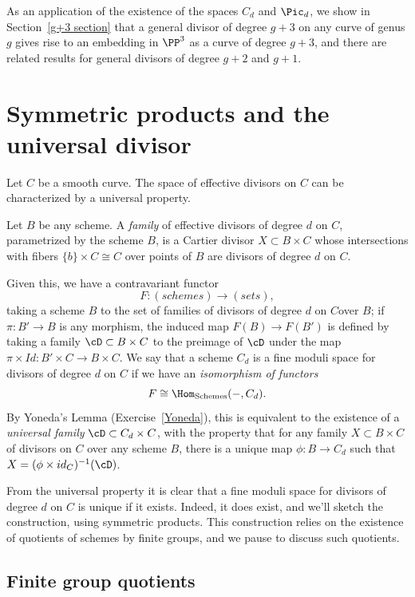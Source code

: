 As an application of the existence of the spaces $C_d$ and $\Pic_d$, we show in Section~\ref{g+3 section} that a general divisor of degree $g+3$ on any curve of genus $g$ gives rise to an embedding in $\PP^3$ as a curve of degree $g+3$, and there are related results for general divisors of degree $g+2$ and $g+1$. 

\section{Symmetric products and the universal divisor}\label{symmetric section}

Let $C$ be a smooth curve. The space of effective divisors on $C$ can be characterized by a universal property. 

\begin{definition}
Let $B$ be any scheme. A \emph{family} of effective divisors of degree $d$ on $C$, parametrized by the scheme $B$, is a Cartier divisor $X\subset B\times C$ whose intersections with fibers $\{b\} \times C \cong C$ over points of $B$ are divisors of degree $d$ on $C$.
\end{definition}

Given this, we have a contravariant functor 
$$
F : (schemes) \to (sets),
$$
taking a scheme $B$ to the set of families of divisors of degree $d$ on $C$over $B$; if $\pi : B' \to B$ is any morphism, the induced map $F(B) \to F(B')$ is defined by taking a family $\cD \subset B \times C$ to the preimage of $\cD$ under the map $\pi \times Id : B' \times C \to B \times C$. We say that a scheme $C_d$ is a fine moduli space for divisors of degree $d$ on $C$ if we have an \emph{isomorphism of functors}
$$
F \cong \Hom_{\rm{Schemes}}( -, C_d).
$$
By Yoneda's Lemma (Exercise~\ref{Yoneda}), this is equivalent to the existence of a \emph{universal family} $\cD \subset C_d \times C$, with the property that for any family $X \subset B \times C$ of divisors on $C$ over any scheme $B$, there is a unique map $\phi : B \to C_d$ such that $X = (\phi \times id_{C})^{-1}(\cD)$.

From the universal property it is clear that a fine moduli space for divisors of degree $d$ on $C$ is unique if it exists. Indeed, it does exist, and we'll sketch the construction, using symmetric products. This construction relies on the existence of quotients of schemes by finite groups, and we pause to discuss such quotients.

\subsection{Finite group quotients}


